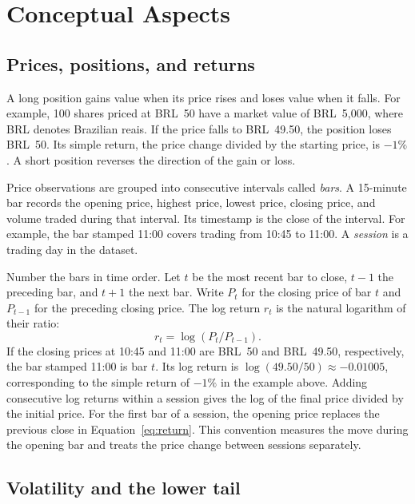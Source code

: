 \documentclass[
	12pt,				%
	openright,			%
	twoside,			%
	a4paper,
	chapter=TITLE,
	english				%
	]{abntex2}
\begin{document}
\chapter{Conceptual Aspects} \label{cap:conceitos}

\section{Prices, positions, and returns}

A long position gains value when its price rises and loses value when it falls. For example, 100 shares priced at BRL~50 have a market value of BRL~5,000, where BRL denotes Brazilian reais. If the price falls to BRL~49.50, the position loses BRL~50. Its simple return, the price change divided by the starting price, is $-1\%$. A short position reverses the direction of the gain or loss.

Price observations are grouped into consecutive intervals called \emph{bars}. A 15-minute bar records the opening price, highest price, lowest price, closing price, and volume traded during that interval. Its timestamp is the close of the interval. For example, the bar stamped 11:00 covers trading from 10:45 to 11:00. A \emph{session} is a trading day in the dataset.

Number the bars in time order. Let $t$ be the most recent bar to close, $t-1$ the preceding bar, and $t+1$ the next bar. Write $P_t$ for the closing price of bar $t$ and $P_{t-1}$ for the preceding closing price. The log return $r_t$ is the natural logarithm of their ratio:
\begin{equation}
  r_t = \log(P_t/P_{t-1}).
  \label{eq:return}
\end{equation}
If the closing prices at 10:45 and 11:00 are BRL~50 and BRL~49.50, respectively, the bar stamped 11:00 is bar $t$. Its log return is $\log(49.50/50)\approx-0.01005$, corresponding to the simple return of $-1\%$ in the example above. Adding consecutive log returns within a session gives the log of the final price divided by the initial price. For the first bar of a session, the opening price replaces the previous close in Equation~\ref{eq:return}. This convention measures the move during the opening bar and treats the price change between sessions separately.

\section{Volatility and the lower tail}
\end{document}
